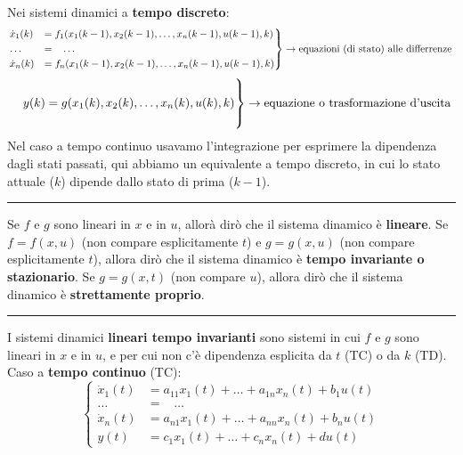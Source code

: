 Nei sistemi dinamici a \textbf{tempo discreto}: 
\[
    \begin{rcases}
        \dot{x}_1(k) &= f_1(x_1(k-1),x_2(k-1), \dots, x_n(k-1), u(k-1), k)\\
        \dots \;\;\;&= \;\;\;\dots\\
        \dot{x}_n(k) &= f_n(x_1(k-1),x_2(k-1), \dots, x_n(k-1), u(k-1), k)
    \end{rcases} \rightarrow \text{equazioni (di stato) alle differrenze}\;
\]
\[
    \begin{rcases}
        \\
        \;\;\;\; y(k) = g(x_1(k),x_2(k), \dots, x_n(k), u(k), k)\\
        \\
    \end{rcases} \rightarrow \text{equazione o trasformazione d'uscita}\;
\]
Nel caso a tempo continuo usavamo l'integrazione per esprimere la dipendenza dagli stati passati, qui abbiamo un equivalente a tempo discreto, in cui lo stato attuale ($k$) dipende dallo stato di prima ($k-1$).\newline
\rule{\textwidth}{0,4pt}\newline
\newline
Se $f$ e $g$ sono lineari in $x$ e in $u$, allorà dirò che il sistema dinamico è \textbf{lineare}.\newline
\newline
Se $f = f(x,u)$ (non compare esplicitamente $t$) e $g = g(x,u)$ (non compare esplicitamente $t$), allora dirò che il sistema dinamico è \textbf{tempo invariante o stazionario}.\newline
\newline
Se $g = g(x,t)$ (non compare $u$), allora dirò che il sistema dinamico è \textbf{strettamente proprio}.\newline
\rule{\textwidth}{0,4pt}\newline
\newline
I sistemi dinamici \textbf{lineari tempo invarianti} sono sistemi in cui $f$ e $g$ sono lineari in $x$ e in $u$, e per cui non c'è dipendenza esplicita da $t$ (TC) o da $k$ (TD).\newline
Caso a \textbf{tempo continuo} (TC):
\[
    \begin{cases}
        \dot{x}_1(t) &= a_{11}x_1(t) + \dots+ a_{1n}x_{n}(t) + b_1 u(t)\\
        \dots &= \;\;\; \dots\\
        \dot{x}_n(t) &= a_{n1}x_1(t) +\dots+ a_{nn}x_n(t) + b_nu(t)\\
        y(t) &= c_1x_1(t) + \dots + c_n x_n(t) + d u(t)
    \end{cases}
\]
